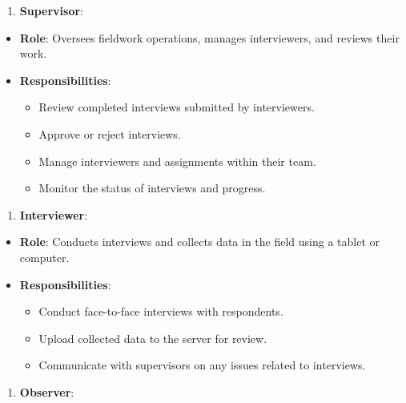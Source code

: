 \documentclass[
  letterpaper,
  DIV=11,
  numbers=noendperiod]{scrreprt}
\providecommand{\tightlist}{%
  \setlength{\itemsep}{0pt}\setlength{\parskip}{0pt}}\usepackage{longtable,booktabs,array}
\begin{document}
\begin{enumerate}
\def\labelenumi{\arabic{enumi}.}
\setcounter{enumi}{2}
\tightlist
\item
  \textbf{Supervisor}:
\end{enumerate}

\begin{itemize}
\item
  \textbf{Role}: Oversees fieldwork operations, manages interviewers,
  and reviews their work.
\item
  \textbf{Responsibilities}:

  \begin{itemize}
  \item
    Review completed interviews submitted by interviewers.
  \item
    Approve or reject interviews.
  \item
    Manage interviewers and assignments within their team.
  \item
    Monitor the status of interviews and progress.
  \end{itemize}
\end{itemize}

\begin{enumerate}
\def\labelenumi{\arabic{enumi}.}
\setcounter{enumi}{3}
\tightlist
\item
  \textbf{Interviewer}:
\end{enumerate}

\begin{itemize}
\item
  \textbf{Role}: Conducts interviews and collects data in the field
  using a tablet or computer.
\item
  \textbf{Responsibilities}:

  \begin{itemize}
  \item
    Conduct face-to-face interviews with respondents.
  \item
    Upload collected data to the server for review.
  \item
    Communicate with supervisors on any issues related to interviews.
  \end{itemize}
\end{itemize}

\begin{enumerate}
\def\labelenumi{\arabic{enumi}.}
\setcounter{enumi}{4}
\tightlist
\item
  \textbf{Observer}:
\end{enumerate}
\end{document}
